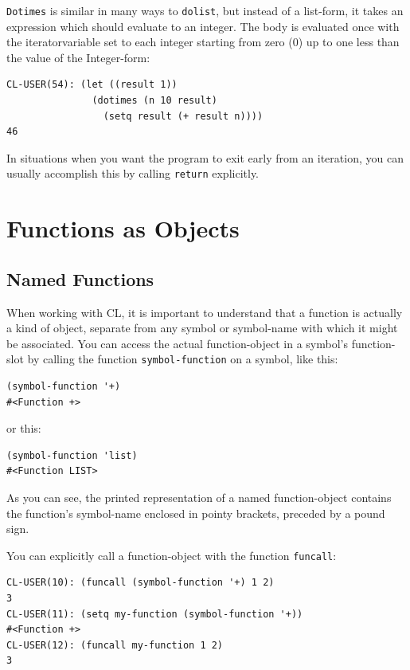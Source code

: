 \texttt{Dotimes} is similar in many ways to \texttt{dolist}, but instead of a list-form, it takes an
expression which should evaluate to an integer. The body is evaluated once with the iteratorvariable set to each integer starting from zero (0) up to one less than the value of the
Integer-form:

\begin{verbatim}
CL-USER(54): (let ((result 1))
               (dotimes (n 10 result)
                 (setq result (+ result n))))
46
\end{verbatim}

In situations when you want the program to exit early from an iteration, you can usually
accomplish this by calling \texttt{return} explicitly.

\section{Functions as Objects}

\subsection{Named Functions}

When working with CL, it is important to understand that a function is actually a kind
of object, separate from any symbol or symbol-name with which it might be associated.
You can access the actual function-object in a symbol's function-slot by calling the function
\texttt{symbol-function} on a symbol, like this:

\begin{verbatim}
(symbol-function '+)
#<Function +>
\end{verbatim}

or this:

\begin{verbatim}
(symbol-function 'list)
#<Function LIST>
\end{verbatim}

As you can see, the printed representation of a named function-object contains the function's
symbol-name enclosed in pointy brackets, preceded by a pound sign.

You can explicitly call a function-object with the function \texttt{funcall}:

\begin{verbatim}
CL-USER(10): (funcall (symbol-function '+) 1 2)
3
CL-USER(11): (setq my-function (symbol-function '+))
#<Function +>
CL-USER(12): (funcall my-function 1 2)
3
\end{verbatim}

